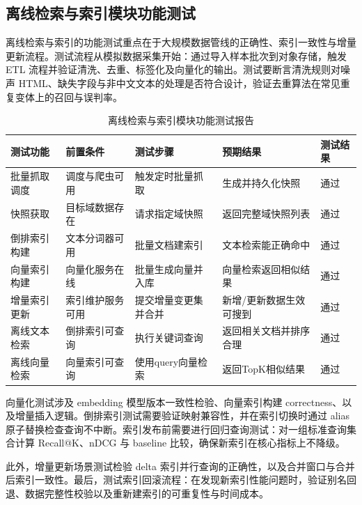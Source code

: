 \subsection{离线检索与索引模块功能测试}
离线检索与索引的功能测试重点在于大规模数据管线的正确性、索引一致性与增量更新流程。测试流程从模拟数据采集开始：通过导入样本批次到对象存储，触发 ETL 流程并验证清洗、去重、标签化及向量化的输出。测试要断言清洗规则对噪声 HTML、缺失字段与非中文文本的处理是否符合设计，验证去重算法在常见重复变体上的召回与误判率。
\begin{table}[htb]
\centering
\caption{离线检索与索引模块功能测试报告}
\label{tab:offline-retrieval-test-brief}
{\renewcommand{\arraystretch}{1.2}
\begin{tabular}{p{3cm} p{2cm} p{2cm} p{3cm} p{2cm}}
\hline
测试功能 & 前置条件 & 测试步骤 & 预期结果 & 测试结果 \\
\hline
批量抓取调度 & 调度与爬虫可用 & 触发定时批量抓取 & 生成并持久化快照 & 通过 \\\hline
快照获取 & 目标域数据存在 & 请求指定域快照 & 返回完整域快照列表 & 通过 \\\hline
倒排索引构建 & 文本分词器可用 & 批量文档建索引 & 文本检索能正确命中 & 通过 \\\hline
向量索引构建 & 向量化服务在线 & 批量生成向量并入库 & 向量检索返回相似结果 & 通过 \\\hline
增量索引更新 & 索引维护服务可用 & 提交增量变更集并合并 & 新增/更新数据生效可搜到 & 通过 \\\hline
离线文本检索 & 倒排索引可查询 & 执行关键词查询 & 返回相关文档并排序合理 & 通过 \\\hline
离线向量检索 & 向量索引可查询 & 使用query向量检索 & 返回TopK相似结果 & 通过 \\\hline
\end{tabular}
}
\end{table}
向量化测试涉及 embedding 模型版本一致性检验、向量索引构建 correctness、以及增量插入逻辑。倒排索引测试需要验证映射兼容性，并在索引切换时通过 alias 原子替换检查查询不中断。索引发布前需要进行回归查询测试：对一组标准查询集合计算 Recall@K、nDCG 与 baseline 比较，确保新索引在核心指标上不降级。

此外，增量更新场景测试检验 delta 索引并行查询的正确性，以及合并窗口与合并后索引一致性。最后，测试索引回滚流程：在发现新索引性能问题时，验证别名回退、数据完整性校验以及重新建索引的可重复性与时间成本。
